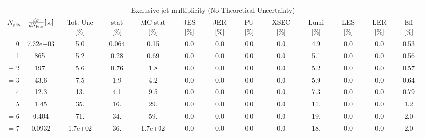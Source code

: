 \documentclass{article}
\begin{document}
\begin{table}[htb!]
\begin{center}
\begin{adjustwidth}{-3cm}{}
\begin{tabular}{c|cc|cccccccccc}
\multicolumn{13}{c}{Exclusive jet multiplicity (No Theoretical Uncertainty)} \\
$N_{\text{jets}}$ & $\frac{d\sigma}{dN_{\text{jets}}} \tiny{\left[\text{pb}\right]}$ & \tiny{Tot. Unc [\%]} & \tiny{stat [\%]} & \tiny{MC stat [\%]} & \tiny{JES [\%]} & \tiny{JER [\%]} & \tiny{PU [\%]} & \tiny{XSEC [\%]} & \tiny{Lumi [\%]} & \tiny{LES [\%]} & \tiny{LER [\%]} & \tiny{Eff [\%]} \\\hline
= 0 & 7.32e+03 & 5.0 & 0.064 & 0.15 & 0.0 & 0.0 & 0.0 & 0.0 & 4.9 & 0.0 & 0.0 & 0.53 \\
= 1 & 865. & 5.2 & 0.28 & 0.69 & 0.0 & 0.0 & 0.0 & 0.0 & 5.1 & 0.0 & 0.0 & 0.56 \\
= 2 & 197. & 5.6 & 0.76 & 1.8 & 0.0 & 0.0 & 0.0 & 0.0 & 5.2 & 0.0 & 0.0 & 0.57 \\
= 3 & 43.6 & 7.5 & 1.9 & 4.2 & 0.0 & 0.0 & 0.0 & 0.0 & 5.9 & 0.0 & 0.0 & 0.64 \\
= 4 & 12.3 & 13. & 4.1 & 9.5 & 0.0 & 0.0 & 0.0 & 0.0 & 7.3 & 0.0 & 0.0 & 0.79 \\
= 5 & 1.45 & 35. & 16. & 29. & 0.0 & 0.0 & 0.0 & 0.0 & 11. & 0.0 & 0.0 & 1.2 \\
= 6 & 0.404 & 71. & 34. & 59. & 0.0 & 0.0 & 0.0 & 0.0 & 19. & 0.0 & 0.0 & 2.0 \\
= 7 & 0.0932 & 1.7e+02 & 36. & 1.7e+02 & 0.0 & 0.0 & 0.0 & 0.0 & 18. & 0.0 & 0.0 & 2.0 \\
\end{tabular}
\label{tab:SMuZNGoodJets_Zexc}
\end{adjustwidth}
\end{center}
\end{table}
\end{document}
